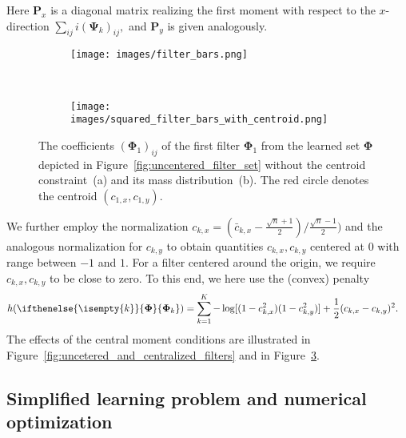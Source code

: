 \documentclass[journal]{IEEEtran}
\newcommand{\Matrix}[1]{\mathbf{#1}}
\newcommand{\AOF}[1]{\ifthenelse{\isempty{#1}}{\boldsymbol{\Phi}}{\boldsymbol{\Phi}_{#1}}}
\begin{document}
Here $\Matrix{P}_x$ is a diagonal matrix realizing the first moment with respect to the $x$-direction
$\sum_{ij} i ({\boldsymbol{\Psi}}_{k})_{ij},$
and $\Matrix{P}_y$ is given analogously.
\begin{figure}[htbp]
    \centering
    \begin{subfigure}[b]{0.48\linewidth}
        \texttt{[image: images/filter\_bars.png]}
        \caption{}
                \label{fig:filter_centroid_a}
    \end{subfigure}
    ~
    \begin{subfigure}[b]{0.48\linewidth}
        \texttt{[image: images/squared\_filter\_bars\_with\_centroid.png]}
                \caption{}
        \label{fig:filter_centroid_b}
    \end{subfigure}
    \caption{The coefficients $(\boldsymbol{\Phi}_1)_{ij}$ of the first filter $\boldsymbol{\Phi}_1$ from the learned set $\boldsymbol{\Phi}$ depicted in Figure~\ref{fig:uncentered_filter_set} without the centroid constraint~(a) and its mass distribution~(b). The red circle denotes the centroid $(c_{1,x}, c_{1,y})$.}
    \label{fig:filter_centroid}
\end{figure}
We further employ the normalization 
\(
c_{k,x} = (\bar{c}_{k,x} - \tfrac{\sqrt{n}+1}{2})/\tfrac{\sqrt{n}-1}{2})
\)
and the analogous normalization for $c_{k,y}$  
to obtain quantities $c_{k,x}, c_{k,y}$  centered at $0$ with range between $-1$ and $1.$ 
For a filter centered around the origin,
we require $c_{k,x}, c_{k,y}$ to be close to zero.
To this end, we here use the (convex) penalty
\begin{align} \label{eq:centered_moment_penalty}
h(\AOF{k}) &= \sum_{k=1}^K -\log [ (1-c_{k,x}^2) (1 - c_{k,y}^2) ] + \frac{1}{2} (c_{k,x}-c_{k,y})^2.          \end{align}
The effects of the central moment conditions
are illustrated in Figure~\ref{fig:uncetered_and_centralized_filters}
and in Figure~\ref{fig:filter_centroid}.


\subsection{Simplified learning problem and numerical optimization}
\label{subsec:SimplifiedlearningOpt}
\end{document}
